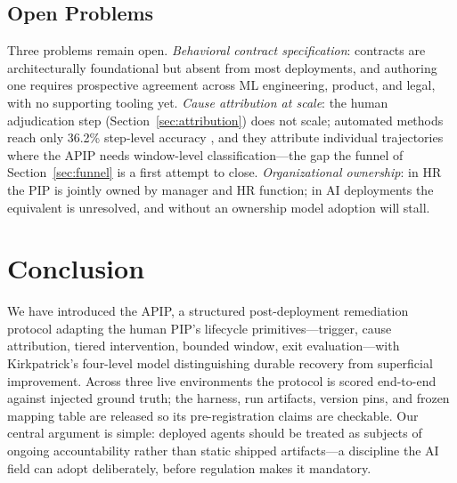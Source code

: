 \documentclass[conference]{IEEEtran}
\begin{document}
\subsection{Open Problems}
\label{sec:open}

Three problems remain open. \emph{Behavioral contract specification}: contracts
are architecturally foundational but absent from most deployments, and
authoring one requires prospective agreement across ML engineering, product,
and legal, with no supporting tooling yet. \emph{Cause attribution at scale}:
the human adjudication step (Section~\ref{sec:attribution}) does not scale;
automated methods reach only 36.2\% step-level accuracy
\cite{ma2025attribution, zhang2025}, and they attribute individual trajectories
where the APIP needs window-level classification---the gap the funnel of
Section~\ref{sec:funnel} is a first attempt to close. \emph{Organizational
ownership}: in HR the PIP is jointly owned by manager and HR function; in AI
deployments the equivalent is unresolved, and without an ownership model
adoption will stall.

\section{Conclusion}

We have introduced the APIP, a structured post-deployment remediation protocol
adapting the human PIP's lifecycle primitives---trigger, cause attribution,
tiered intervention, bounded window, exit evaluation---with Kirkpatrick's
four-level model distinguishing durable recovery from superficial improvement.
Across three live environments the protocol is scored end-to-end against
injected ground truth; the harness, run artifacts, version pins, and frozen
mapping table are released so its pre-registration claims are checkable. Our
central argument is simple: deployed agents should be treated as subjects of
ongoing accountability rather than static shipped artifacts---a discipline the
AI field can adopt deliberately, before regulation makes it mandatory.
\end{document}

